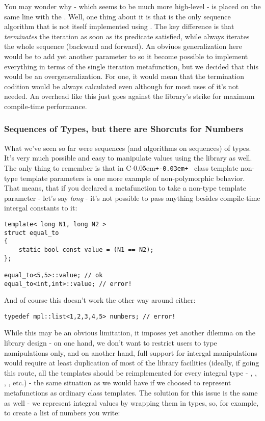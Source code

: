 \documentclass{netobjectdays}
\newcommand{\Cpp}{C\kern-0.05em\texttt{+\kern-0.03em+}%
}
\begin{document}
You may wonder why  - which seems to be much 
more high-level - is placed on the same line with the 
. Well, one thing about it is that 
 is the only sequence algorithm that is not 
itself implemented using . The key difference 
is that  \emph{terminates} the iteration as 
soon as its predicate satisfied, while  
always iterates the whole sequence (backward and forward). 
An obviuos generalization here would be to add yet another 
parameter to  so it become possible to 
implement everything in terms of the single iteration 
metafunction, but we decided that this would be an 
overgeneralization. For one, it would mean that the 
termination codition would be always calculated even 
although for most uses of  it's not needed. 
An overhead like this just goes against the library's strike 
for maximum compile-time performance.


\subsubsection{Sequences of Types, but there are Shorcuts for Numbers}

What we've seen so far were sequences (and algorithms on 
sequences) of types. It's very much possible and easy to 
manipulate values using the library as well. The only thing 
to remember is that in \Cpp\ class template non-type template 
parameters is one more example of non-polymorphic behavior. %
That means, that if you declared a metafunction to take a 
non-type template parameter - let's say \emph{long} - 
it's not possible to pass anything besides compile-time 
intergal constants to it:

{\footnotesize
\begin{verbatim}
template< long N1, long N2 >
struct equal_to
{
    static bool const value = (N1 == N2);
};

equal_to<5,5>::value; // ok
equal_to<int,int>::value; // error!
\end{verbatim}
}

And of course this doesn't work the other way around either:

{\footnotesize
\begin{verbatim}
typedef mpl::list<1,2,3,4,5> numbers; // error!
\end{verbatim}
}

While this may be an obvious limitation, it imposes yet 
another dilemma on the library design - on one hand, we don't 
want to restrict users to type namipulations only, and on another 
hand, full support for intergal manipulations would require at 
least duplication of most of the library facilities (ideally, 
if going this route, all the templates should be reimplemented 
for every integral type - , , ,
, etc.) - the same situation as we would have if we 
choosed to represent metafunctions as ordinary class templates.
The solution for this issue is the same as well - we represent 
integral values by wrapping them in types, so, for example, to 
create a list of numbers you write:
\end{document}
